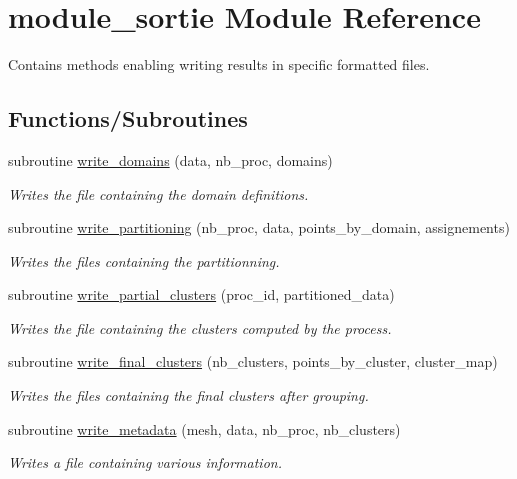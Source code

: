 \hypertarget{namespacemodule__sortie}{}\section{module\+\_\+sortie Module Reference}
\label{namespacemodule__sortie}


Contains methods enabling writing results in specific formatted files.  


\subsection*{Functions/\+Subroutines}
\begin{DoxyCompactItemize}
\item 
subroutine \hyperlink{namespacemodule__sortie_a835f7338c29161d6893c6bbddf4174f4}{write\+\_\+domains} (data, nb\+\_\+proc, domains)
\begin{DoxyCompactList}\small\item\em Writes the file containing the domain definitions. \end{DoxyCompactList}\item 
subroutine \hyperlink{namespacemodule__sortie_abd1cdf529e5c71b3186c8d980e3d5117}{write\+\_\+partitioning} (nb\+\_\+proc, data, points\+\_\+by\+\_\+domain, assignements)
\begin{DoxyCompactList}\small\item\em Writes the files containing the partitionning. \end{DoxyCompactList}\item 
subroutine \hyperlink{namespacemodule__sortie_a24e663b5fc236eee7c6fe434493e342e}{write\+\_\+partial\+\_\+clusters} (proc\+\_\+id, partitioned\+\_\+data)
\begin{DoxyCompactList}\small\item\em Writes the file containing the clusters computed by the process. \end{DoxyCompactList}\item 
subroutine \hyperlink{namespacemodule__sortie_a819ceed76e9600e8eec63a7b730d1d92}{write\+\_\+final\+\_\+clusters} (nb\+\_\+clusters, points\+\_\+by\+\_\+cluster, cluster\+\_\+map)
\begin{DoxyCompactList}\small\item\em Writes the files containing the final clusters after grouping. \end{DoxyCompactList}\item 
subroutine \hyperlink{namespacemodule__sortie_a3093c50035046621188d9a0da3b8a587}{write\+\_\+metadata} (mesh, data, nb\+\_\+proc, nb\+\_\+clusters)
\begin{DoxyCompactList}\small\item\em Writes a file containing various information. \end{DoxyCompactList}\end{DoxyCompactItemize}


